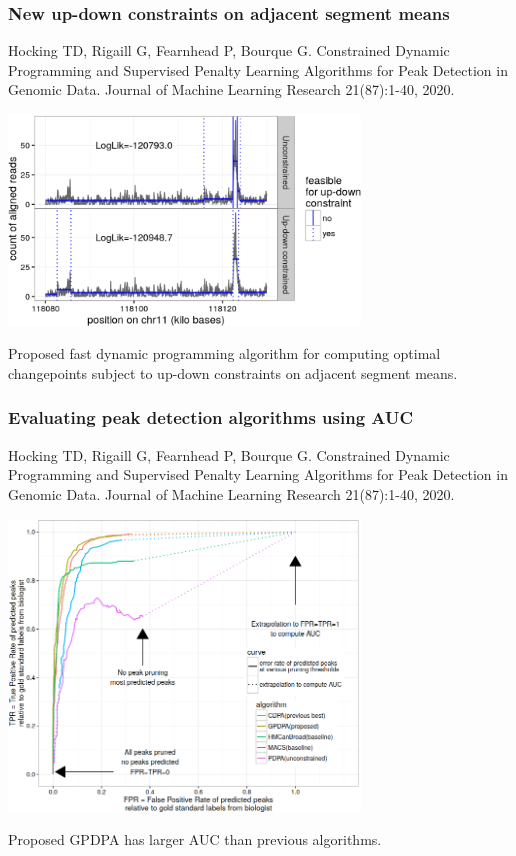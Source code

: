 \documentclass[t]{beamer}
\begin{document}
\begin{frame}
  \frametitle{New up-down constraints on adjacent segment means}
{\scriptsize Hocking TD, Rigaill G, Fearnhead P, Bourque G. Constrained Dynamic Programming and Supervised Penalty Learning Algorithms for Peak Detection in Genomic Data. Journal of Machine Learning Research 21(87):1-40, 2020.}

  \includegraphics[width=0.7\textwidth]{figure-Hocking2020-peak-constraints}

  Proposed fast dynamic programming algorithm for computing optimal
  changepoints subject to up-down constraints on adjacent segment
  means.
\end{frame}

\begin{frame}
  \frametitle{Evaluating peak detection algorithms using AUC}
{\scriptsize Hocking TD, Rigaill G, Fearnhead P, Bourque G. Constrained Dynamic Programming and Supervised Penalty Learning Algorithms for Peak Detection in Genomic Data. Journal of Machine Learning Research 21(87):1-40, 2020.}

  \includegraphics[width=0.7\textwidth]{figure-Hocking2020-roc}

  Proposed GPDPA has larger AUC than previous algorithms.

\end{frame}
\end{document}
